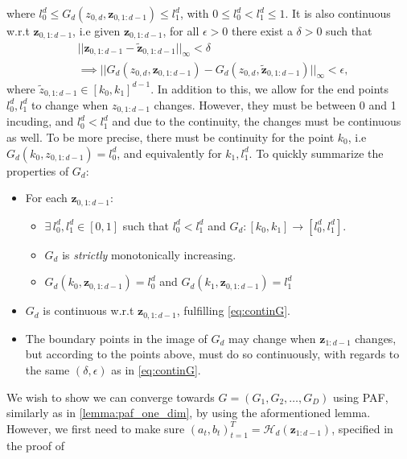 where \(l_0^{d} \leq G_d(z_{0,d}, \bm z_{0,1:d-1}) \leq l^d_1\), with \(0 \leq l_0^d < l_1^d \leq 1\).
It is also continuous
w.r.t \(\bm z_{0,1:d-1}\), i.e given \(\bm z_{0,1:d-1}\), for all \(\epsilon > 0\) there exist a \(\delta > 0\) such that
\begin{align}\label{eq:continG}
    &\lvert\lvert \bm z_{0,1:d-1} - \tilde {\bm z}_{0,1:d-1} \rvert\rvert_{\infty} < \delta\\ &\implies 
    \lvert\lvert G_d(z_{0,d}, \bm z_{0,1:d-1}) - G_d(z_{0,d} ,\tilde{\bm z}_{0,1:d-1})\rvert\rvert_{\infty} < \epsilon,\nonumber
\end{align}
where \(\tilde z_{0,1:d-1} \in [k_0,k_1]^{d-1}\). In addition to this, we allow for the end points \(l_0^d, l_1^d\) to change when \(z_{0,1:d-1}\) changes.
However, they must be between 0 and 1 incuding, and \(l_0^d < l_1^d\) and due to the continuity, the changes must be continuous as well. 
To be more precise, there must be continuity for the point \(k_0\), i.e 
\(G_d(k_0, z_{0,1:d-1}) = l^d_0\), and equivalently for \(k_1, l_1^d\). To quickly summarize the properties of \(G_d\):
\begin{itemize}
    \item For each \(\bm z_{0,1:d-1}\): 
        \begin{itemize}
            \item \(\exists\, l_0^d, l_1^d \in [0,1]\) such that \(l_0^d < l_1^d\) and \(G_d\colon [k_0,k_1] \rightarrow [l_0^d, l_1^d]\).
            \item \(G_d\) is \emph{strictly} monotonically increasing.
            \item \(G_d(k_0, \bm z_{0,1:d-1}) = l_0^d\) and \(G_d(k_1,\bm z_{0,1:d-1}) = l_1^d\)
        \end{itemize}
    \item \(G_d\) is continuous w.r.t \(\bm z_{0,1:d-1}\), fulfilling \cref{eq:continG}.
    \item The boundary points in the image of \(G_d\) may change when \(\bm z_{1:d-1}\) changes, 
        but according to the points above, must do so continuously, with regards
        to the same \((\delta,\epsilon)\) as in \cref{eq:continG}.
\end{itemize}
We wish to show we can converge towards \(G = (G_1, G_2, \dots, G_D)\) using PAF, similarly as in \cref{lemma:paf_one_dim}, by
using the aformentioned lemma. However, we first need to make sure \((a_t,b_t)_{t=1}^T = \mathcal{H}_d(\bm z_{1:d-1})\), specified in the proof of
